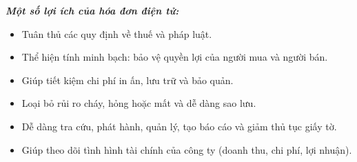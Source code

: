 
\textbf{\textit{Một số lợi ích của hóa đơn điện tử:}}

\begin{itemize}

\item Tuân thủ các quy định về thuế và pháp luật.

\item Thể hiện tính minh bạch: bảo vệ quyền lợi của người mua và người bán.

\item Giúp tiết kiệm chi phí in ấn, lưu trữ và bảo quản.

\item Loại bỏ rủi ro cháy, hỏng hoặc mất và dễ dàng sao lưu.

\item Dễ dàng tra cứu, phát hành, quản lý, tạo báo cáo và giảm thủ tục giấy tờ.

\item Giúp theo dõi tình hình tài chính của công ty (doanh thu, chi phí, lợi nhuận).

\end{itemize}
